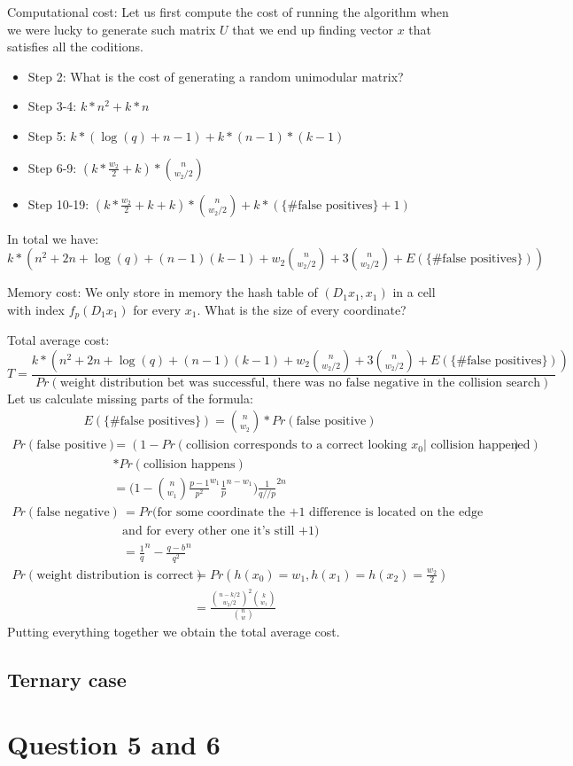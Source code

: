 \documentclass[12pt]{article}
\begin{document}
Computational cost:
Let us first compute the cost of running the algorithm when we were lucky to generate such matrix $U$ that we end up finding vector $x$ that satisfies all the coditions.
\begin{itemize}
    \item Step 2: What is the cost of generating a random unimodular matrix?
    \item Step 3-4: $k*n^2 + k*n$
    \item Step 5: $k*(\log(q) + n-1) + k*(n-1)*(k-1)$
    \item Step 6-9: $(k*\frac{w_2}{2} + k)*\binom{n}{w_2/2}$
    \item Step 10-19: $(k*\frac{w_2}{2} + k + k)*\binom{n}{w_2/2} + k*(\{\text{\# false positives}\} + 1)$
\end{itemize}
In total we have: $k*(n^2 + 2n + \log(q) + (n-1)(k-1) + w_2\binom{n}{w_2/2} + 3\binom{n}{w_2/2} + E(\{\text{\# false positives}\}))$

Memory cost:
We only store in memory the hash table of $(D_1x_1, x_1)$ in a cell with index $f_{p}(D_1x_1)$ for every $x_1$.
What is the size of every coordinate?

Total average cost:
\[
    T = \frac{k*(n^2 + 2n + \log(q) + (n-1)(k-1) + w_2\binom{n}{w_2/2} + 3\binom{n}{w_2/2} + E(\{\text{\# false positives}\}))}{Pr(\text{weight distribution bet was successful, there was no false negative in the collision search})}
\]
Let us calculate missing parts of the formula:
\[
\begin{split}
    E(\{\text{\# false positives}\}) = \binom{n}{w_2}*Pr(\text{false positive})
\end{split}
\]
\[
\begin{split}
    Pr(\text{false positive}) & = (1 - Pr(\text{collision corresponds to a correct looking } x_0| \text{  collision happened})) \\
    & * Pr(\text{collision happens}) \\
    & = \Big(1 - \binom{n}{w_1}\frac{p-1}{p^2}^{w_1}\frac{1}{p}^{n-w_1}\Big)\frac{1}{q//p}^{2n}
\end{split}
\]
\[
\begin{split}
    Pr(\text{false negative}) & = Pr(\text{for some coordinate the +1 difference is located on the edge of the box} \\
    & \text{and for every other one it's still +1}) \\
    & = \frac{1}{q}^{n} - \frac{q-b}{q^2}^{n}
\end{split}
\]
\[
\begin{split}
    Pr(\text{weight distribution is correct}) & = Pr(h(x_0) = w_1, h(x_1) = h(x_2) = \frac{w_2}{2}) \\
    & = \frac{\binom{n-k/2}{w_2/2}^{2}\binom{k}{w_1}}{\binom{n}{w}}
\end{split}
\]
Putting everything together we obtain the total average cost.

\subsection{Ternary case}

\section{Question 5 and 6}




\end{document}

